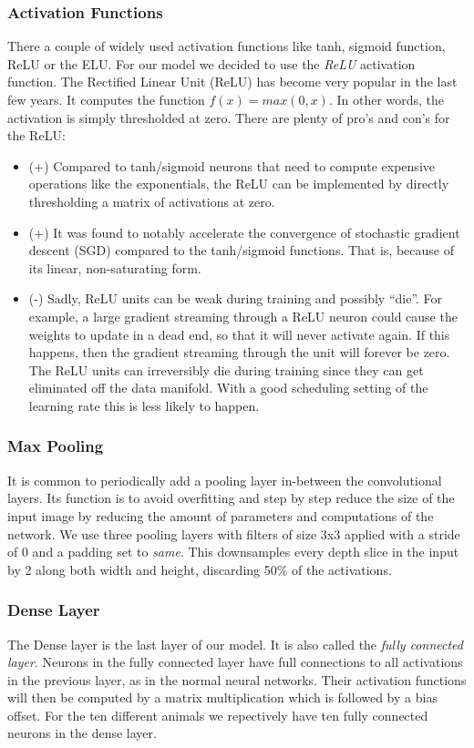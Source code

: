 \documentclass[journal]{IEEEtran}
\begin{document}
\subsubsection{Activation Functions}
There a couple of widely used activation functions like tanh, sigmoid function, ReLU or the ELU. For our model we decided to use the \textit{ReLU} activation function. The Rectified Linear Unit (ReLU) has become very popular in the last few years. It computes the function \(f(x)=max(0,x)\). In other words, the activation is simply thresholded at zero. There are plenty of pro's and con's for the ReLU:
\begin{itemize}
\item (+) Compared to tanh/sigmoid neurons that need to compute expensive operations  like the exponentials, the ReLU can be implemented by directly thresholding a matrix of activations at zero.
\item (+) It was found to notably accelerate the convergence of stochastic gradient descent (SGD) compared to the tanh/sigmoid functions. That is, because of its linear, non-saturating form.
\item (-) Sadly, ReLU units can be weak during training and possibly “die”. For example, a large gradient streaming through a ReLU neuron could cause the weights to update in a dead end, so that it will never activate again. If this happens, then the gradient streaming through the unit will forever be zero. The ReLU units can irreversibly die during training since they can get eliminated off the data manifold. With a good scheduling setting of the learning rate this is less likely to happen. \\
\end{itemize}
\subsubsection{Max Pooling}
It is common to periodically add a pooling layer in-between the convolutional layers. Its function is to avoid overfitting and step by step reduce the size of the input image by reducing the amount of parameters and computations of the network. We use three pooling layers with filters of size 3x3 applied with a stride of 0 and a padding set to \textit{same}. This downsamples every depth slice in the input by 2 along both width and height, discarding 50\% of the activations. \\
\subsubsection{Dense Layer}
The Dense layer is the last layer of our model. It is also called the \textit{fully connected layer}. Neurons in the fully connected layer have full connections to all activations in the previous layer, as in the normal neural networks. Their activation functions will then be computed by a matrix multiplication which is followed by a bias offset. 
For the ten different animals we repectively have ten fully connected neurons in the dense layer. \\
\end{document}
